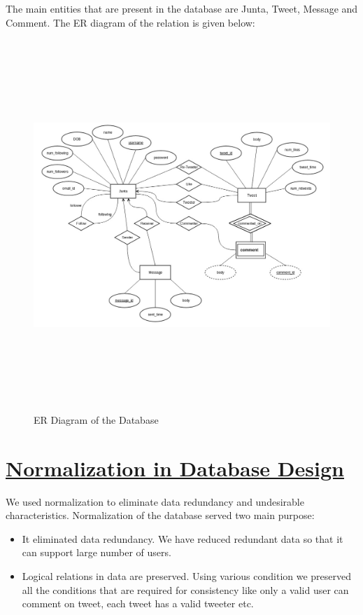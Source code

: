 \documentclass[a4paper]{article}
\begin{document}
The main entities that are present in the database are Junta, Tweet, Message and Comment. The ER diagram of the relation is given below:\\
\begin{figure}[h]
\includegraphics[width=18cm, height=14cm]{er2.jpg}
\caption{ER Diagram of the Database}
\end{figure}
\section*{{\underline{Normalization in Database Design}}}

We used normalization to eliminate data redundancy and undesirable characteristics. Normalization of the database served two main purpose:
\begin{itemize}
\item It eliminated data redundancy. We have reduced redundant data so that it can support large number of users.
\item Logical relations in data are preserved. Using various condition we preserved all the conditions that are required for consistency like only a valid user can comment on tweet, each tweet has a valid tweeter etc.
\end{itemize}
\end{document}
